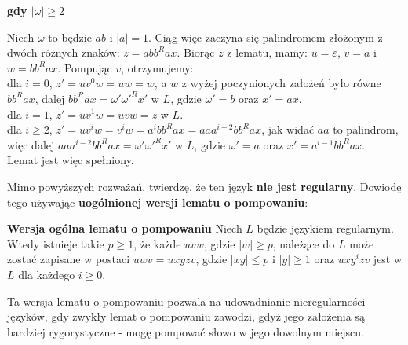 \documentclass[15pt, a4paper]{article}
\begin{document}
\noindent \textbf{gdy \(|\omega| \geq 2\)}

\vspace{0.5cm}

\noindent Niech \( \omega \) to będzie \(ab\) i \(|a| = 1\). Ciąg więc zaczyna się palindromem złożonym z dwóch różnych znaków: \(z = abb^Rax\). Biorąc \(z\) z lematu, mamy: \(u = \varepsilon \), \( v = a\) i \( w = bb^Rax \). Pompując \(v\), otrzymujemy:\\
dla \(i = 0 \), \(z' = uv^0w = uw = w \), a \(w\) z wyżej poczynionych założeń było równe \(bb^Rax \), dalej  \(bb^Rax = \omega' \omega'^R x' \) w \(L\), gdzie \( \omega' = b \) oraz \(x' = ax\). \\
dla \(i = 1\), \( z' = uv^1w = uvw = z \) w \(L\).\\
dla \(i \geq 2\), \( z' = uv^iw = v^iw = a^ibb^Rax = aaa^{i-2}bb^Rax \), jak widać \( aa \) to palindrom, więc dalej \(aaa^{i-2}bb^Rax = \omega' \omega'^R x' \) w \(L\), gdzie \(\omega' = a\) oraz \( x' = a^{i-1}bb^Rax \).\\
Lemat jest więc spełniony.

\vspace{0.5cm}

\noindent Mimo powyższych rozważań, twierdzę, że ten język \textbf{nie jest regularny}. Dowiodę tego używając \textbf{uogólnionej wersji lematu o pompowaniu}:

\vspace{0.5cm}

\noindent \textbf{Wersja ogólna lematu o pompowaniu}
Niech \(L\) będzie językiem regularnym. Wtedy istnieje takie \(p \geq 1\), że każde \(uwv\), gdzie \(|w| \geq p\), należące do \(L\) może zostać zapisane w postaci \(uwv = uxyzv\), gdzie \(|xy| \leq p\) i \(|y| \geq 1\) oraz \(uxy^izv\) jest w \(L\) dla każdego \(i \geq 0\).

\vspace{0.5cm}

\noindent Ta wersja lematu o pompowaniu pozwala na udowadnianie nieregularności języków, gdy zwykły lemat o pompowaniu zawodzi, gdyż jego założenia są bardziej rygorystyczne - mogę pompować słowo w jego dowolnym miejscu.

\vspace{0.5cm}
\end{document}
